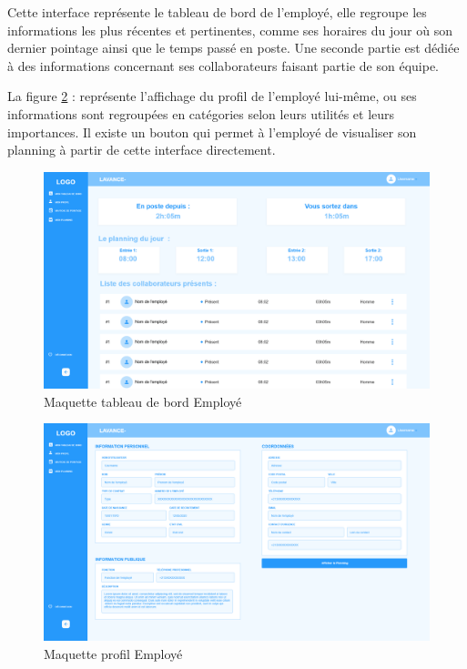         Cette interface représente le tableau de bord de l’employé, elle regroupe les informations les plus récentes et pertinentes, comme ses horaires du jour où son dernier pointage ainsi que le temps passé en poste. Une seconde partie est dédiée à des informations concernant ses collaborateurs faisant partie de son équipe.
        
        La figure \ref{fig7} : représente l’affichage du profil de l’employé lui-même, ou ses informations sont regroupées en catégories selon leurs utilités et leurs importances. Il existe un bouton qui permet à l’employé de visualiser son planning à partir de cette interface directement. 
        \clearpage
        
        
       \begin{figure}[h!]
         \centering
      \includegraphics[width=18cm]{images/dash_emp.png}
         \caption{Maquette tableau de bord Employé}
         \label{fig6}
        \end{figure}
        
       
        
        \begin{figure}[h!]
         \centering
      \includegraphics[width=18cm]{images/profil.png}
      \caption{Maquette profil Employé}
      \label{fig7}    
        \end{figure}
        


